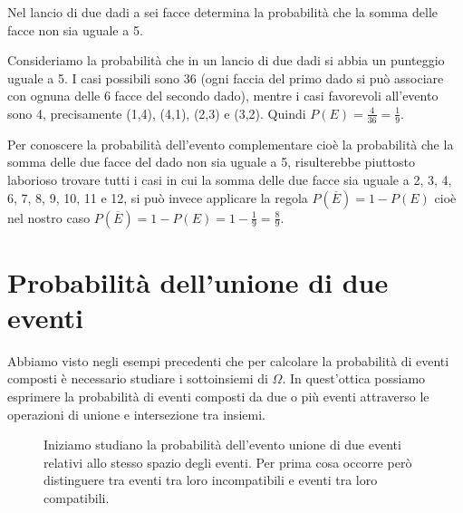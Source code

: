 \begin{esempio}
Nel lancio di due dadi a sei facce determina la probabilità che la somma 
delle 
facce non sia uguale a 5.

Consideriamo la probabilità che in un lancio di due dadi si abbia un 
punteggio 
uguale a 5. I casi possibili sono 36 (ogni faccia del primo dado si può 
associare con ognuna delle 6 facce del secondo dado), mentre i casi 
favorevoli 
all'evento sono 4, precisamente (1,4), (4,1), (2,3) e (3,2). Quindi 
$P(E)=\frac 
4{36}=\frac 1 9$.

Per conoscere la probabilità dell'evento complementare cioè la probabilità 
che 
la somma delle due facce del dado non sia uguale a 5, risulterebbe piuttosto 
laborioso trovare tutti i casi in cui la somma delle due facce sia uguale a 
2, 
3, 4, 6, 7, 8, 9, 10, 11 e 12, si può invece applicare la regola $P(\overline 
E)=1-P(E)$ cioè nel nostro caso $P(\overline E)=1-P(E)=1-\frac 1 9=\frac 8 9$.
\end{esempio}


\section{Probabilità dell'unione di due eventi}
\label{sec:03_unione}

Abbiamo visto negli esempi precedenti che per calcolare la probabilità di 
eventi composti è necessario studiare i sottoinsiemi di $\Omega$. In 
quest'ottica possiamo esprimere la probabilità di eventi composti da due o 
più 
eventi attraverso le operazioni di unione e intersezione tra insiemi.
\begin{inaccessibleblock}
 \begin{figure}[htpb]
\begin{minipage}[c]{.35\textwidth}

\end{minipage}\hfil
\begin{minipage}[c]{.55\textwidth}
Iniziamo studiano la probabilità dell'evento unione di due eventi relativi 
allo 
stesso spazio degli eventi.
Per prima cosa occorre però distinguere tra eventi tra loro incompatibili e 
eventi tra loro compatibili.
\end{minipage}
\end{figure}
\end{inaccessibleblock}





